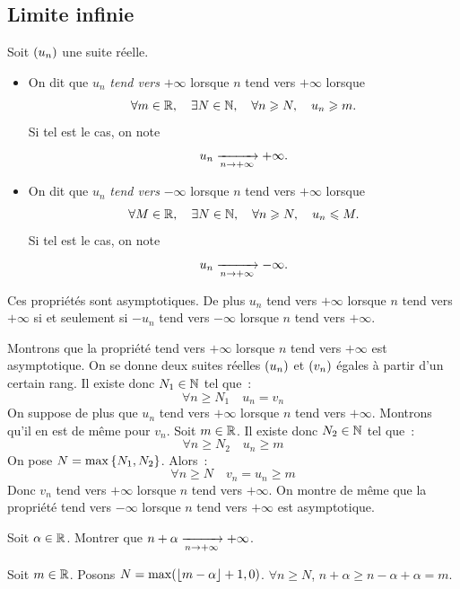 \documentclass{magnolia}
\begin{document}
\subsection{Limite infinie}

\begin{definition}[utile=-3]
Soit $\left(u_n\right)$ une suite réelle.
\begin{itemize}
\item On dit que $u_n$ \emph{tend vers} $+\infty$ lorsque $n$ tend vers $+\infty$
  lorsque
  \[\forall m\in\mathbb{R} ,\quad \exists N\in\mathbb{N} ,\quad \forall n\geqslant N ,\quad
    u_n\geqslant m.\]
  Si tel est le cas, on note
  \[u_n \xrightarrow[n\rightarrow +\infty]{} +\infty.\]
\item On dit que $u_n$ \emph{tend vers} $-\infty$ lorsque $n$ tend vers $+\infty$
  lorsque
  \[\forall M\in\mathbb{R} ,\quad \exists N\in\mathbb{N} ,\quad \forall n\geqslant N ,\quad
    u_n\leqslant M.\]
  Si tel est le cas, on note
  \[u_n \xrightarrow[n\rightarrow +\infty]{} -\infty.\]
\end{itemize}
Ces propriétés sont asymptotiques. De plus $u_n$ tend vers $+\infty$ lorsque
$n$ tend vers $+\infty$ si et seulement si $-u_n$ tend vers $-\infty$ lorsque
$n$ tend vers $+\infty$.
\end{definition}

\begin{preuve}
Montrons que la propriété \og tend vers $+\infty$ lorsque $n$ tend vers
$+\infty$ \fg est asymptotique. On se donne deux suites réelles $\left(u_n\right)$ et
$\left(v_n\right)$ égales à partir d'un certain rang. Il existe donc $N_1\in\mathbb{N}$ tel
que~:
\[\forall n\geq N_1 \quad u_n=v_n\]
On suppose de plus que $u_n$ tend vers $+\infty$ lorsque $n$ tend vers
$+\infty$. Montrons qu'il en est de même pour $v_n$. Soit $m\in\mathbb{R}$. Il existe
donc $N_2\in\mathbb{N}$ tel que~:
\[\forall n\geq N_2 \quad u_n \geq m\]
On pose $N=\max\left\{N_1,N_2\right\}$. Alors~:
\[\forall n\geq N \quad v_n=u_n \geq m\]
Donc $v_n$ tend vers $+\infty$ lorsque $n$ tend vers $+\infty$. On montre
de même que la propriété \og tend vers $-\infty$ lorsque $n$ tend vers
$+\infty$ \fg est asymptotique.
\end{preuve}

\begin{exoUnique}
\exo Soit $\alpha\in\mathbb{R}$. Montrer que $n+\alpha\xrightarrow[n\rightarrow +\infty]{}+\infty$.
\end{exoUnique}

\begin{sol}
Soit $m\in \mathbb{R}$. Posons $N=\max(\left\lfloor m-\alpha\right\rfloor+1,0)$. $\forall n\geq N$, $n+\alpha\geq n-\alpha+\alpha=m$.
\end{sol}
\end{document}
